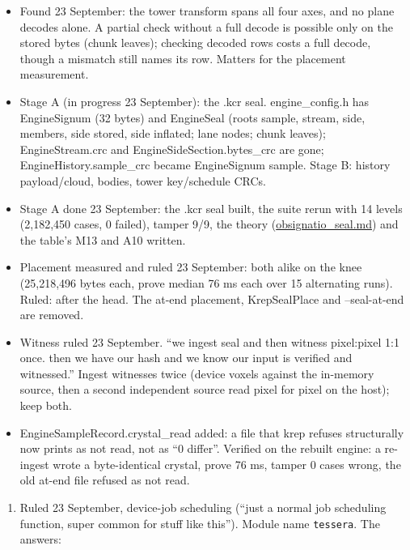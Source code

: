 \begin{itemize}
\item Found 23 September: the tower transform spans all four axes, and no plane decodes alone. A partial check without a full decode is possible only on the stored bytes (chunk leaves); checking decoded rows costs a full decode, though a mismatch still names its row. Matters for the placement measurement.
\item Stage A (in progress 23 September): the .kcr seal. engine\_\allowbreak{}config.h has EngineSignum (32 bytes) and EngineSeal (roots sample, stream, side, members, side stored, side inflated; lane nodes; chunk leaves); EngineStream.crc and EngineSideSection.bytes\_\allowbreak{}crc are gone; EngineHistory.sample\_\allowbreak{}crc became EngineSignum sample. Stage B: history payload/cloud, bodies, tower key/schedule CRCs.
\item Stage A done 23 September: the .kcr seal built, the suite rerun with 14 levels (2,182,450 cases, 0 failed), tamper 9/9, the theory (\hyperref[chap:obsignatio-seal]{obsignatio\_\allowbreak{}seal.md}) and the table's M13 and A10 written.
\item Placement measured and ruled 23 September: both alike on the knee (25,218,496 bytes each, prove median 76 ms each over 15 alternating runs). Ruled: after the head. The at-end placement, KrepSealPlace and --seal-at-end are removed.
\item Witness ruled 23 September. “we ingest seal and then witness pixel:pixel 1:1 once. then we have our hash and we know our input is verified and witnessed.” Ingest witnesses twice (device voxels against the in-memory source, then a second independent source read pixel for pixel on the host); keep both.
\item EngineSampleRecord.crystal\_\allowbreak{}read added: a file that krep refuses structurally now prints as not read, not as “0 differ”. Verified on the rebuilt engine: a re-ingest wrote a byte-identical crystal, prove 76 ms, tamper 0 cases wrong, the old at-end file refused as not read.
\end{itemize}

\begin{enumerate}
\item Ruled 23 September, device-job scheduling (“just a normal job scheduling function, super common for stuff like this”). Module name \texttt{tessera}. The answers:
\end{enumerate}

